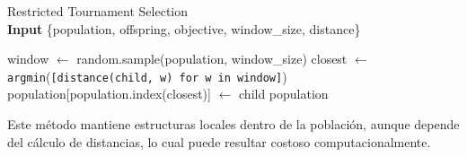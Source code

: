\begin{algorithm}[H]
	\caption{Restricted Tournament Selection \\ \textbf{Input} \{population, offspring, objective, window\_size, distance\}}
	\begin{algorithmic}[1]
		\State window $\gets$ random.sample(population, window\_size)
		\State closest $\gets$ \texttt{argmin}(\texttt{[distance(child, w) for w in window]})
		\State population[population.index(closest)] $\gets$ child
		\EndIf
		\EndFor
		\State \Return population
		\EndFunction
	\end{algorithmic}
	\label{alg:replacement_rts}
\end{algorithm}

Este método mantiene estructuras locales dentro de la población, aunque depende del cálculo de distancias, lo cual puede resultar costoso computacionalmente.
